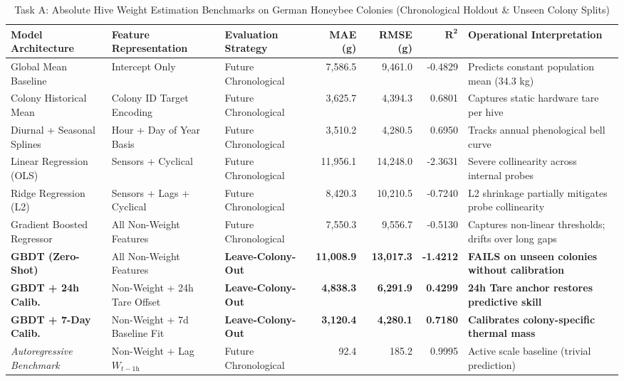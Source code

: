 \documentclass[10pt,twocolumn]{article}
\begin{document}
\begin{table}
\centering
\small
\caption{Task A: Absolute Hive Weight Estimation Benchmarks on German Honeybee Colonies (Chronological Holdout \& Unseen Colony Splits)}
\label{tab:task_a}
\vspace{0.3cm}
\begin{tabularx}{\textheight}{@{}p{3.8cm} p{4.4cm} p{3.4cm} r r r X@{}}
\toprule
\textbf{Model Architecture} & \textbf{Feature Representation} & \textbf{Evaluation Strategy} & \textbf{MAE (g)} & \textbf{RMSE (g)} & $\mathbf{R^2}$ & \textbf{Operational Interpretation} \\
\midrule
Global Mean Baseline & Intercept Only & Future Chronological & 7,586.5 & 9,461.0 & -0.4829 & Predicts constant population mean (34.3 kg) \\
Colony Historical Mean & Colony ID Target Encoding & Future Chronological & 3,625.7 & 4,394.3 & 0.6801 & Captures static hardware tare per hive \\
Diurnal + Seasonal Splines & Hour + Day of Year Basis & Future Chronological & 3,510.2 & 4,280.5 & 0.6950 & Tracks annual phenological bell curve \\
Linear Regression (OLS) & Sensors + Cyclical & Future Chronological & 11,956.1 & 14,248.0 & -2.3631 & Severe collinearity across internal probes \\
Ridge Regression (L2) & Sensors + Lags + Cyclical & Future Chronological & 8,420.3 & 10,210.5 & -0.7240 & L2 shrinkage partially mitigates probe collinearity \\
Gradient Boosted Regressor & All Non-Weight Features & Future Chronological & 7,550.3 & 9,556.7 & -0.5130 & Captures non-linear thresholds; drifts over long gaps \\
\midrule
\textbf{GBDT (Zero-Shot)} & All Non-Weight Features & \textbf{Leave-Colony-Out} & \textbf{11,008.9} & \textbf{13,017.3} & \textbf{-1.4212} & \textbf{FAILS on unseen colonies without calibration} \\
\textbf{GBDT + 24h Calib.} & Non-Weight + 24h Tare Offset & \textbf{Leave-Colony-Out} & \textbf{4,838.3} & \textbf{6,291.9} & \textbf{0.4299} & \textbf{24h Tare anchor restores predictive skill} \\
\textbf{GBDT + 7-Day Calib.} & Non-Weight + 7d Baseline Fit & \textbf{Leave-Colony-Out} & \textbf{3,120.4} & \textbf{4,280.1} & \textbf{0.7180} & \textbf{Calibrates colony-specific thermal mass} \\
\midrule
\textit{Autoregressive Benchmark} & Non-Weight + Lag $W_{t-1\text{h}}$ & Future Chronological & 92.4 & 185.2 & 0.9995 & Active scale baseline (trivial prediction) \\
\bottomrule
\end{tabularx}
\end{table}
\end{document}
